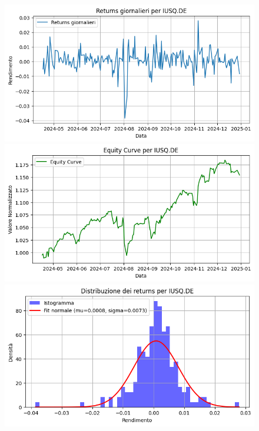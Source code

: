 \documentclass{article}%
\begin{document}
\begin{figure}[htbp]%
\begin{minipage}{0.31\textwidth}%
\includegraphics[width=\linewidth]{immagini_tickers/IUSQ.DE_returns_plot.png}%
\end{minipage}%
\begin{minipage}{0.31\textwidth}%
\includegraphics[width=\linewidth]{immagini_tickers/IUSQ.DE_equity_curve.png}%
\end{minipage}%
\begin{minipage}{0.31\textwidth}%
\includegraphics[width=\linewidth]{immagini_tickers/IUSQ.DE_distribuzione_returns.png}%
\end{minipage}%
\end{figure}
\end{document}
